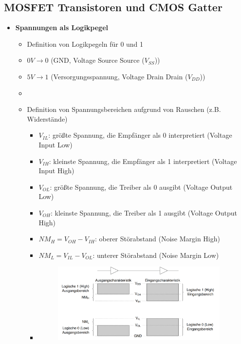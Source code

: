 \documentclass[11pt,a4paper]{article}
\begin{document}
\subsection{MOSFET Transistoren und CMOS Gatter}
\begin{itemize}

\item \textbf{Spannungen als Logikpegel}
	\begin{itemize}
	\item Definition von Logikpegeln für 0 und 1
	\item $0V \rightarrow 0$ (GND, Voltage Source Source ($V_{SS}$))
	\item $5V \rightarrow 1$ (Versorgungsspannung, Voltage Drain Drain ($V_{DD}$))
	\item[]
	\item Definition von Spannungsbereichen aufgrund von Rauschen (z.B. Widerstände)
		\begin{itemize}
		\item $V_{IL}$: größte Spannung, die Empfänger als 0 interpretiert (Voltage Input Low)
		\item $V_{IH}$: kleinste Spannung, die Empfänger als 1 interpretiert (Voltage Input High)
		\item $V_{OL}$: größte Spannung, die Treiber als 0 ausgibt (Voltage Output Low)
		\item $V_{OH}$: kleinste Spannung, die Treiber als 1 ausgibt (Voltage Output High)
		\item $NM_H= V_{OH} - V_{IH}$: oberer Störabstand (Noise Margin High)
		\item $NM_L = V_{IL} - V_{OL}$: unterer Störabstand (Noise Margin Low)
		\item[] \begin{figure}[H]
				\begin{center}
				\includegraphics[height=4cm]{Bilder/spannungsbereiche}
				\end{center}
				\end{figure}
		\end{itemize}
	\end{itemize}


\end{itemize}
\end{document}
